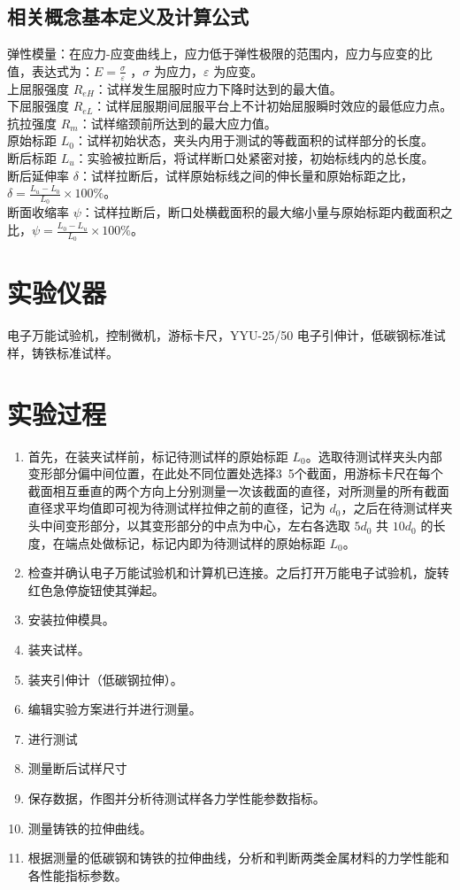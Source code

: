 \documentclass[a4paper,utf8]{article}
\begin{document}
\subsection{相关概念基本定义及计算公式}
\noindent 弹性模量：在应力-应变曲线上，应力低于弹性极限的范围内，应力与应变的比值，表达式为：\linebreak $E =\displaystyle \frac{\sigma}{\varepsilon}$ ，$\sigma$ 为应力，$\varepsilon$ 为应变。\\
上屈服强度 $R_{eH}$：试样发生屈服时应力下降时达到的最大值。\\
下屈服强度 $R_{eL}$：试样屈服期间屈服平台上不计初始屈服瞬时效应的最低应力点。\\
抗拉强度 $R_m$：试样缩颈前所达到的最大应力值。\\
原始标距 $L_0$：试样初始状态，夹头内用于测试的等截面积的试样部分的长度。\\
断后标距 $L_u$：实验被拉断后，将试样断口处紧密对接，初始标线内的总长度。\\
断后延伸率 $\delta$：试样拉断后，试样原始标线之间的伸长量和原始标距之比，$\delta = \displaystyle\frac{L_u-L_0}{L_0}\times 100\%$。\\
断面收缩率 $\psi$：试样拉断后，断口处横截面积的最大缩小量与原始标距内截面积之比，\linebreak $\psi = \displaystyle\frac{L_0-L_u}{L_0}\times 100\%$。
\section{实验仪器}%
电子万能试验机，控制微机，游标卡尺，YYU-25/50 电子引伸计，低碳钢标准试样，铸铁标准试样。
\section{实验过程}%
\begin{enumerate}
    \item 首先，在装夹试样前，标记待测试样的原始标距 $L_0$。选取待测试样夹头内部变形部分偏中间位置，在此处不同位置处选择3~5个截面，用游标卡尺在每个截面相互垂直的两个方向上分别测量一次该截面的直径，对所测量的所有截面直径求平均值即可视为待测试样拉伸之前的直径，记为 $d_0$，之后在待测试样夹头中间变形部分，以其变形部分的中点为中心，左右各选取 $5d_0$ 共 $10d_0$ 的长度，在端点处做标记，标记内即为待测试样的原始标距 $L_0$。
    \item 检查并确认电子万能试验机和计算机已连接。之后打开万能电子试验机，旋转红色急停旋钮使其弹起。
    \item 安装拉伸模具。
    \item 装夹试样。
    \item 装夹引伸计（低碳钢拉伸）。
    \item 编辑实验方案进行并进行测量。
    \item 进行测试
    \item 测量断后试样尺寸
    \item 保存数据，作图并分析待测试样各力学性能参数指标。
    \item 测量铸铁的拉伸曲线。
    \item 根据测量的低碳钢和铸铁的拉伸曲线，分析和判断两类金属材料的力学性能和各性能指标参数。
\end{enumerate}
\end{document}

